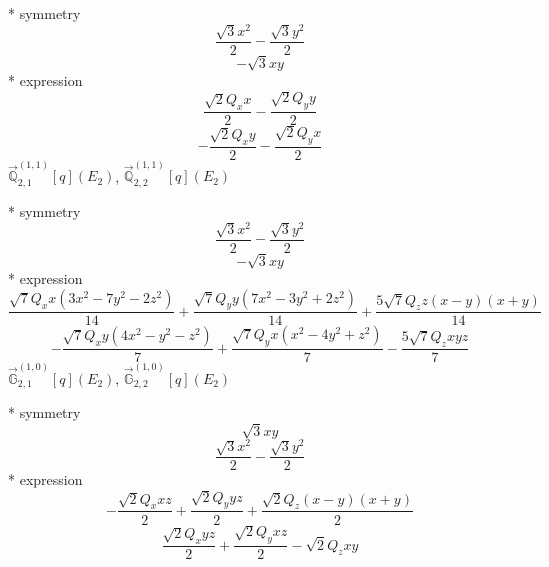 \documentclass[fleqn,8pt]{jsarticle}
\begin{document}
\noindent\quad ** symmetry
\begin{dmath*}
\frac{\sqrt{3} x^{2}}{2} - \frac{\sqrt{3} y^{2}}{2}
\end{dmath*}
\begin{dmath*}
- \sqrt{3} x y
\end{dmath*}
\noindent\quad ** expression
\begin{dmath*}
\frac{\sqrt{2} Q_{x} x}{2} - \frac{\sqrt{2} Q_{y} y}{2}
\end{dmath*}
\begin{dmath*}
- \frac{\sqrt{2} Q_{x} y}{2} - \frac{\sqrt{2} Q_{y} x}{2}
\end{dmath*}
\noindent\quad $\vec{\mathbb{Q}}_{2,1}^{(1,1)}[q](E_{2})$, $\vec{\mathbb{Q}}_{2,2}^{(1,1)}[q](E_{2})$

\noindent\quad ** symmetry
\begin{dmath*}
\frac{\sqrt{3} x^{2}}{2} - \frac{\sqrt{3} y^{2}}{2}
\end{dmath*}
\begin{dmath*}
- \sqrt{3} x y
\end{dmath*}
\noindent\quad ** expression
\begin{dmath*}
\frac{\sqrt{7} Q_{x} x \left(3 x^{2} - 7 y^{2} - 2 z^{2}\right)}{14} + \frac{\sqrt{7} Q_{y} y \left(7 x^{2} - 3 y^{2} + 2 z^{2}\right)}{14} + \frac{5 \sqrt{7} Q_{z} z \left(x - y\right) \left(x + y\right)}{14}
\end{dmath*}
\begin{dmath*}
- \frac{\sqrt{7} Q_{x} y \left(4 x^{2} - y^{2} - z^{2}\right)}{7} + \frac{\sqrt{7} Q_{y} x \left(x^{2} - 4 y^{2} + z^{2}\right)}{7} - \frac{5 \sqrt{7} Q_{z} x y z}{7}
\end{dmath*}
\noindent\quad $\vec{\mathbb{G}}_{2,1}^{(1,0)}[q](E_{2})$, $\vec{\mathbb{G}}_{2,2}^{(1,0)}[q](E_{2})$

\noindent\quad ** symmetry
\begin{dmath*}
\sqrt{3} x y
\end{dmath*}
\begin{dmath*}
\frac{\sqrt{3} x^{2}}{2} - \frac{\sqrt{3} y^{2}}{2}
\end{dmath*}
\noindent\quad ** expression
\begin{dmath*}
- \frac{\sqrt{2} Q_{x} x z}{2} + \frac{\sqrt{2} Q_{y} y z}{2} + \frac{\sqrt{2} Q_{z} \left(x - y\right) \left(x + y\right)}{2}
\end{dmath*}
\begin{dmath*}
\frac{\sqrt{2} Q_{x} y z}{2} + \frac{\sqrt{2} Q_{y} x z}{2} - \sqrt{2} Q_{z} x y
\end{dmath*}
\end{document}
